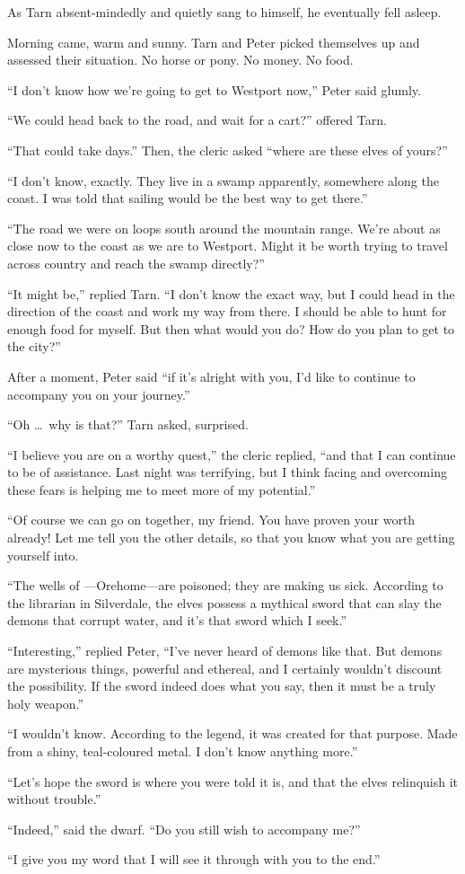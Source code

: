 As Tarn absent-mindedly and quietly sang to himself, he eventually fell asleep.


Morning came, warm and sunny.  Tarn and Peter picked themselves up and assessed their situation.  No horse or pony.  No money.  No food.

``I don't know how we're going to get to Westport now,'' Peter said glumly.

``We could head back to the road, and wait for a cart?'' offered Tarn.

``That could take days.''  Then, the cleric asked ``where are these elves of yours?''

``I don't know, exactly.  They live in a swamp apparently, somewhere along the coast.  I was told that sailing would be the best way to get there.''

``The road we were on loops south around the mountain range.  We're about as close now to the coast as we are to Westport.  Might it be worth trying to travel across country and reach the swamp directly?''

``It might be,'' replied Tarn.  ``I don't know the exact way, but I could head in the direction of the coast and work my way from there.  I should be able to hunt for enough food for myself.  But then what would you do?  How do you plan to get to the city?''

After a moment, Peter said ``if it's alright with you, I'd like to continue to accompany you on your journey.''

``Oh \ldots\ why is that?'' Tarn asked, surprised.

``I believe you are on a worthy quest,'' the cleric replied, ``and that I can continue to be of assistance.  Last night was terrifying, but I think facing and overcoming these fears is helping me to meet more of my potential.''

``Of course we can go on together, my friend.  You have proven your worth already!  Let me tell you the other details, so that you know what you are getting yourself into.

``The wells of \korbarthrond---Orehome---are poisoned; they are making us sick.  According to the librarian in Silverdale, the elves possess a mythical sword that can slay the demons that corrupt water, and it's that sword which I seek.''

``Interesting,'' replied Peter, ``I've never heard of demons like that.  But demons are mysterious things, powerful and ethereal, and I certainly wouldn't discount the possibility.  If the sword indeed does what you say, then it must be a truly holy weapon.''

``I wouldn't know.  According to the legend, it was created for that purpose.  Made from a shiny, teal-coloured metal.  I don't know anything more.''

``Let's hope the sword is where you were told it is, and that the elves relinquish it without trouble.''

``Indeed,'' said the dwarf.  ``Do you still wish to accompany me?''

``I give you my word that I will see it through with you to the end.''